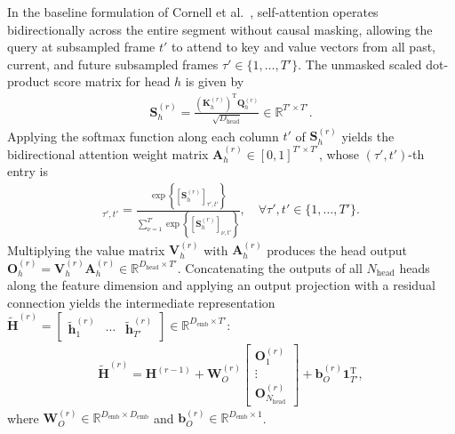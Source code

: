 \documentclass[lettersize,journal]{IEEEtran}
\begin{document}
In the baseline formulation of Cornell et al.~\cite{cornell2022overlapped}, self-attention operates bidirectionally across the entire segment without causal masking, allowing the query at subsampled frame $t'$ to attend to key and value vectors from all past, current, and future subsampled frames $\tau' \in \{1, \dots, T'\}$. The unmasked scaled dot-product score matrix for head $h$ is given by
\begin{align}
  \mathbf{S}_h^{(r)} = \frac{\left(\mathbf{K}_h^{(r)}\right)^{\mathrm{T}} \mathbf{Q}_h^{(r)}}{\sqrt{D_{\mathrm{head}}}} \in \mathbb{R}^{T' \times T'}.
  \label{eq:attention_scores}
\end{align}
Applying the softmax function along each column $t'$ of $\mathbf{S}_h^{(r)}$ yields the bidirectional attention weight matrix $\mathbf{A}_h^{(r)} \in [0, 1]^{T' \times T'}$, whose $(\tau', t')$-th entry is
\begin{align}
  [\mathbf{A}_h^{(r)}]_{\tau', t'} = \frac{\exp\!\left\{ [\mathbf{S}_h^{(r)}]_{\tau', t'} \right\}}{\sum_{\nu=1}^{T'} \exp\!\left\{ [\mathbf{S}_h^{(r)}]_{\nu, t'} \right\}}, \quad \forall \tau', t' \in \{1, \dots, T'\}.
  \label{eq:bidirectional_attention_weights}
\end{align}
Multiplying the value matrix $\mathbf{V}_h^{(r)}$ with $\mathbf{A}_h^{(r)}$ produces the head output $\mathbf{O}_h^{(r)} = \mathbf{V}_h^{(r)} \mathbf{A}_h^{(r)} \in \mathbb{R}^{D_{\mathrm{head}} \times T'}$. Concatenating the outputs of all $N_{\mathrm{head}}$ heads along the feature dimension and applying an output projection with a residual connection yields the intermediate representation $\widetilde{\mathbf{H}}^{(r)} = \begin{bmatrix} \tilde{\mathbf{h}}_1^{(r)} & \cdots & \tilde{\mathbf{h}}_{T'}^{(r)} \end{bmatrix} \in \mathbb{R}^{D_{\mathrm{emb}} \times T'}$:
\begin{align}
  \widetilde{\mathbf{H}}^{(r)} = \mathbf{H}^{(r-1)} + \mathbf{W}_O^{(r)}
  \begin{bmatrix}
    \mathbf{O}_1^{(r)} \\
    \vdots \\
    \mathbf{O}_{N_{\mathrm{head}}}^{(r)}
  \end{bmatrix}
  + \mathbf{b}_O^{(r)} \mathbf{1}_{T'}^{\mathrm{T}},
  \label{eq:mha_residual}
\end{align}
where $\mathbf{W}_O^{(r)} \in \mathbb{R}^{D_{\mathrm{emb}} \times D_{\mathrm{emb}}}$ and $\mathbf{b}_O^{(r)} \in \mathbb{R}^{D_{\mathrm{emb}} \times 1}$.
\end{document}
